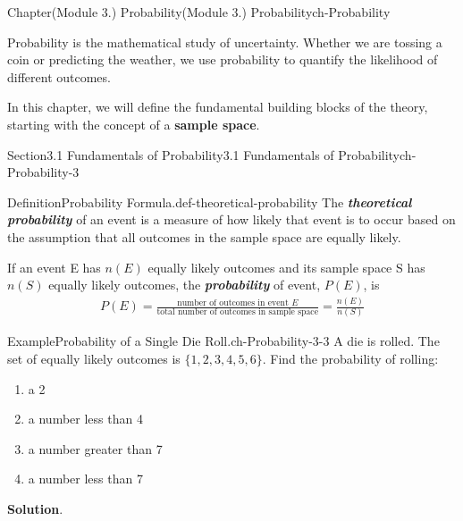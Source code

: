 \documentclass[oneside,10pt,]{book}
\newcommand{\blocktitlefont}{\relax}
\newcommand{\alert}[1]{\textbf{\textit{#1}}}
\newcommand{\terminology}[1]{\textbf{#1}}
\begin{document}
\begin{chapterptx}{Chapter}{(Module 3.) Probability}{}{(Module 3.) Probability}{}{}{ch-Probability}
\renewcommand*{\chaptername}{Chapter}
\begin{introduction}{}%
Probability is the mathematical study of uncertainty. Whether we are tossing a coin or predicting the weather, we use probability to quantify the likelihood of different outcomes.%
\par
In this chapter, we will define the fundamental building blocks of the theory, starting with the concept of a \terminology{sample space}.%
\end{introduction}%
%
%
\typeout{************************************************}
\typeout{************************************************}
%
\begin{sectionptx}{Section}{3.1 Fundamentals of Probability}{}{3.1 Fundamentals of Probability}{}{}{ch-Probability-3}
\begin{definition}{Definition}{Probability Formula.}{def-theoretical-probability}%
The \alert{theoretical probability} of an event is a measure of how likely that event is to occur based on the assumption that all outcomes in the sample space are equally likely.%
\par
If an event E has \(n(E)\) equally likely outcomes and its sample space S has \(n(S)\) equally likely outcomes, the \alert{probability} of event, \(P(E)\), is%
\begin{gather*}
P(E) = \frac{\text{number of outcomes in event } E}{\text{total number of outcomes in sample space}} = \frac{n(E)}{n(S)}
\end{gather*}
%
\end{definition}
\begin{example}{Example}{Probability of a Single Die Roll.}{ch-Probability-3-3}%
A die is rolled. The set of equally likely outcomes is \(\{1, 2, 3, 4, 5, 6\}\). Find the probability of rolling:%
\par
%
\begin{enumerate}
\item{}a 2%
\item{}a number less than 4%
\item{}a number greater than 7%
\item{}a number less than 7%
\end{enumerate}
%
\par\smallskip%
\noindent\textbf{\blocktitlefont Solution}.\hypertarget{ch-Probability-3-3-3}{}\quad{}%

\end{example}
\end{sectionptx}
\end{chapterptx}
\end{document}
